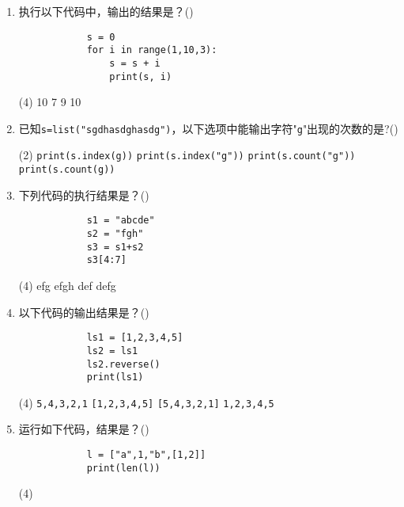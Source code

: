 \documentclass[11pt]{ctexart}
\begin{document}
    \begin{enumerate}
        \item 执行以下代码中，输出的结果是？(\qquad)
        \begin{lstlisting}
            s = 0
            for i in range(1,10,3):    
                s = s + i
                print(s, i)
        \end{lstlisting}
        \begin{tasks}(4)
             10
             7
             9
             10
        \end{tasks}

        \item 已知\lstinline!s=list("sgdhasdghasdg")!，以下选项中能输出字符"\lstinline{g}"出现的次数的是?(\qquad)
        \begin{tasks}(2)
            \task \lstinline{print(s.index(g))}
            \task \lstinline{print(s.index("g"))}
            \task \lstinline{print(s.count("g"))}
            \task \lstinline{print(s.count(g))}
        \end{tasks}

        \item 下列代码的执行结果是？(\qquad)
        \begin{lstlisting}
            s1 = "abcde"
            s2 = "fgh"
            s3 = s1+s2
            s3[4:7]
        \end{lstlisting}
        \begin{tasks}(4)
            \task efg
            \task efgh
            \task def
            \task defg
        \end{tasks}

        \item 以下代码的输出结果是？(\qquad)
        \begin{lstlisting}
            ls1 = [1,2,3,4,5]
            ls2 = ls1 
            ls2.reverse()
            print(ls1)
        \end{lstlisting}
        \begin{tasks}(4)
            \task \lstinline!5,4,3,2,1!
            \task \lstinline![1,2,3,4,5]!
            \task \lstinline![5,4,3,2,1]!
            \task \lstinline!1,2,3,4,5!
        \end{tasks}

        \item  运行如下代码，结果是？(\qquad)
        \begin{lstlisting}
            l = ["a",1,"b",[1,2]]
            print(len(l))
        \end{lstlisting}
        \begin{tasks}(4)
        \end{tasks}


\end{enumerate}
\end{document}
